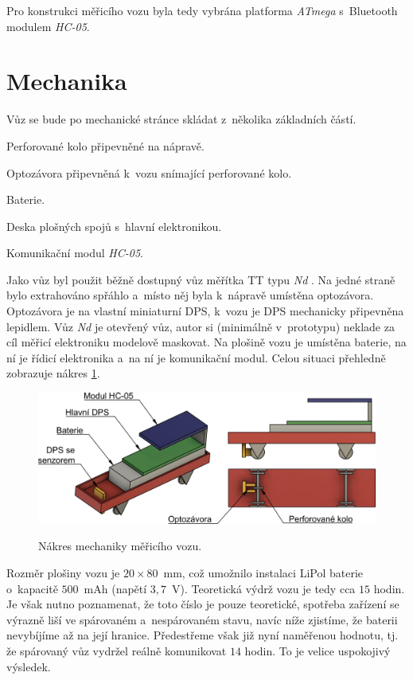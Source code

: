 Pro konstrukci měřicího vozu byla tedy vybrána platforma \textit{ATmega}
s~Bluetooth modulem \textit{HC-05}.

\section{Mechanika}
\label{sec:wsm-mech}

Vůz se bude po mechanické stránce skládat z~několika základních částí.

\begin{compactenum}
\item Perforované kolo připevněné na nápravě.
\item Optozávora připevněná k~vozu snímající perforované kolo.
\item Baterie.
\item Deska plošných spojů s~hlavní elektronikou.
\item Komunikační modul \textit{HC-05}.
\end{compactenum}

Jako vůz byl použit běžně dostupný vůz měřítka TT typu \textit{Nd}
\cite{vuz-nd}. Na jedné straně bylo extrahováno spřáhlo a~místo něj byla
k~nápravě umístěna optozávora. Optozávora je na vlastní miniaturní DPS, k~vozu
je DPS mechanicky připevněna lepidlem. Vůz \textit{Nd} je otevřený vůz, autor si
(minimálně v~prototypu) neklade za cíl měřicí elektroniku modelově maskovat. Na
plošině vozu je umístěna baterie, na ní je řídicí elektronika a~na ní je
komunikační modul. Celou situaci přehledně zobrazuje nákres
\ref{fig:vuz-nakres}.

\begin{figure}[ht]
\caption{Nákres mechaniky měřicího vozu.}
\includegraphics[width=\textwidth]{data/wsm-3d.png}
\label{fig:vuz-nakres}
\end{figure}

Rozměr plošiny vozu je $20\times80$~mm, což umožnilo instalaci LiPol baterie
o~kapacitě $500$~mAh (napětí $3,7$~V). Teoretická výdrž vozu je tedy cca $15$
hodin. Je však nutno poznamenat, že toto číslo je pouze teoretické, spotřeba
zařízení se výrazně liší ve spárovaném a~nespárovaném stavu, navíc níže
zjistíme, že baterii nevybíjíme až na její hranice. Předestřeme však již nyní
naměřenou hodnotu, tj. že spárovaný vůz vydržel reálně komunikovat $14$ hodin.
To je velice uspokojivý výsledek.

